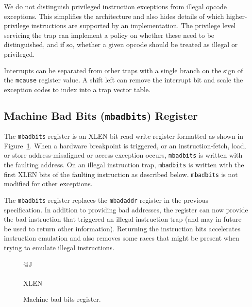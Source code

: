 \begin{commentary}
We do not distinguish privileged instruction exceptions from illegal
opcode exceptions.  This simplifies the architecture and also hides
details of which higher-privilege instructions are supported by an
implementation.  The privilege level servicing the trap can implement
a policy on whether these need to be distinguished, and if so, whether
a given opcode should be treated as illegal or privileged.
\end{commentary}

\begin{commentary}
Interrupts can be separated from other traps with a single branch on the sign of
the {\tt mcause} register value.  A shift left can remove the
interrupt bit and scale the exception codes to index into a trap
vector table.
\end{commentary}

\subsection{Machine Bad Bits ({\tt mbadbits}) Register}

The {\tt mbadbits} register is an XLEN-bit read-write register
formatted as shown in Figure~\ref{mbadbitsreg}. When a hardware
breakpoint is triggered, or an instruction-fetch, load, or store
address-misaligned or access exception occurs, {\tt mbadbits} is
written with the faulting address.  On an illegal instruction trap,
{\tt mbadbits} is written with the first XLEN bits of the faulting
instruction as described below.  {\tt mbadbits} is not modified for
other exceptions.

\begin{commentary}
  The {\tt mbadbits} register replaces the {\tt mbadaddr} register in
  the previous specification.  In addition to providing bad addresses,
  the register can now provide the bad instruction that triggered an
  illegal instruction trap (and may in future be used to return other
  information).  Returning the instruction bits accelerates instruction emulation and also
  removes some races that might be present when trying to emulate
  illegal instructions.
\end{commentary}  

\begin{figure}[h!]
{\footnotesize
\begin{center}
\begin{tabular}{@{}J}
 \\
\hline
{} \\
\hline
XLEN \\
\end{tabular}
\end{center}
}
\vspace{-0.1in}
\caption{Machine bad bits register.}
\label{mbadbitsreg}
\end{figure}

